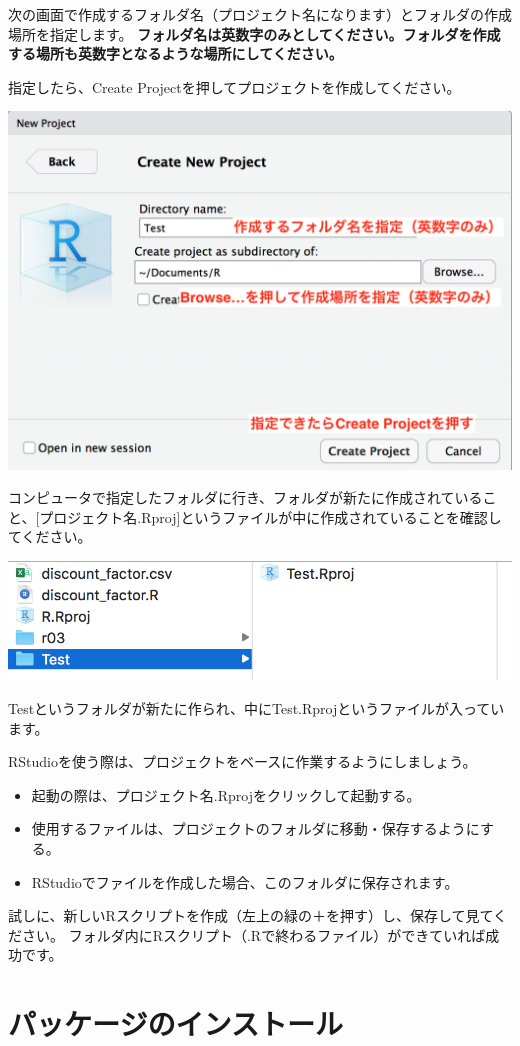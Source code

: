 \documentclass[]{book}
\providecommand{\tightlist}{%
  \setlength{\itemsep}{0pt}\setlength{\parskip}{0pt}}
\begin{document}
次の画面で作成するフォルダ名（プロジェクト名になります）とフォルダの作成場所を指定します。
\textbf{フォルダ名は英数字のみとしてください。フォルダを作成する場所も英数字となるような場所にしてください。}

指定したら、Create Projectを押してプロジェクトを作成してください。

\begin{center}\includegraphics[width=0.5\linewidth]{image/project4} \end{center}

コンピュータで指定したフォルダに行き、フォルダが新たに作成されていること、{[}プロジェクト名.Rproj{]}というファイルが中に作成されていることを確認してください。

\begin{center}\includegraphics[width=0.5\linewidth]{image/project5} \end{center}

Testというフォルダが新たに作られ、中にTest.Rprojというファイルが入っています。

RStudioを使う際は、プロジェクトをベースに作業するようにしましょう。

\begin{itemize}
\tightlist
\item
  起動の際は、プロジェクト名.Rprojをクリックして起動する。
\item
  使用するファイルは、プロジェクトのフォルダに移動・保存するようにする。
\item
  RStudioでファイルを作成した場合、このフォルダに保存されます。
\end{itemize}

試しに、新しいRスクリプトを作成（左上の緑の＋を押す）し、保存して見てください。
フォルダ内にRスクリプト（.Rで終わるファイル）ができていれば成功です。

\chapter{パッケージのインストール}\label{Packages}
\end{document}
